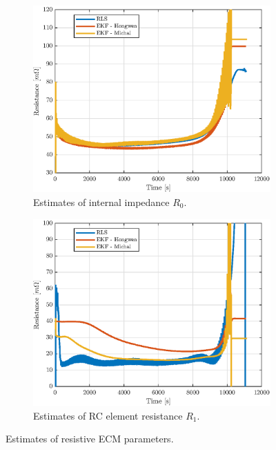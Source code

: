 \begin{figure}[hbp]
    \centering
\begin{subfigure}{0.49\textwidth}
    \centering
    \includegraphics[width=\textwidth]{figures/10/est-R0.eps}
    \caption{Estimates of internal impedance $R_0$.}
    \label{fig:10-R0}
    \end{subfigure}
    \hfill
    \begin{subfigure}{0.49\textwidth}
    \centering
    \includegraphics[width=\textwidth]{figures/10/est-R1.eps}
    \caption{Estimates of RC element resistance $R_1$.}
    \label{fig:10-R1}
    \end{subfigure}
    
    \caption{Estimates of resistive ECM parameters.}
    \label{fig:10-R}
\end{figure}

